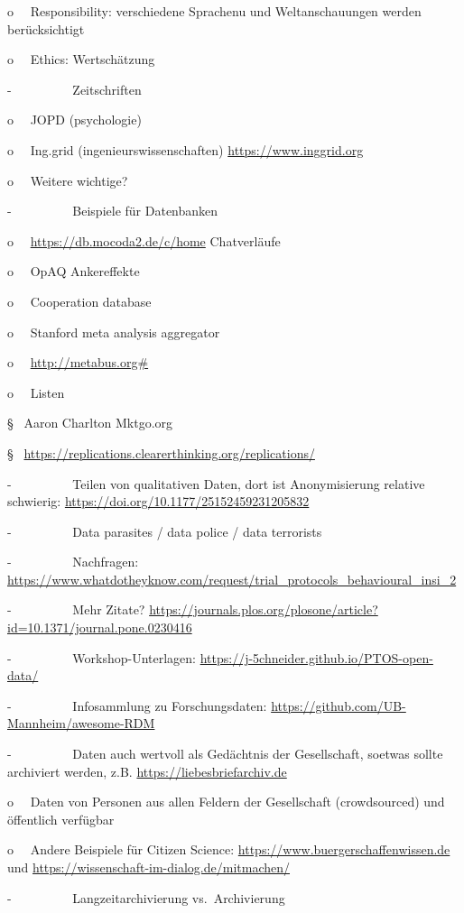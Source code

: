 \documentclass[
  letterpaper,
  DIV=11,
  numbers=noendperiod]{scrreprt}
\begin{document}
o~~ Responsibility: verschiedene Sprachenu und Weltanschauungen werden
berücksichtigt

o~~ Ethics: Wertschätzung

-~~~~~~~~~ Zeitschriften

o~~ JOPD (psychologie)

o~~ Ing.grid (ingenieurswissenschaften) \url{https://www.inggrid.org}

o~~ Weitere wichtige?

-~~~~~~~~~ Beispiele für Datenbanken

o~~ \url{https://db.mocoda2.de/c/home} Chatverläufe

o~~ OpAQ Ankereffekte

o~~ Cooperation database

o~~ Stanford meta analysis aggregator

o~~ \href{http://metabus.org}{http://metabus.org\#}

o~~ Listen

§~ Aaron Charlton Mktgo.org

§~ \url{https://replications.clearerthinking.org/replications/}

-~~~~~~~~~ Teilen von qualitativen Daten, dort ist Anonymisierung
relative schwierig: \url{https://doi.org/10.1177/25152459231205832}

-~~~~~~~~~ Data parasites / data police / data terrorists

-~~~~~~~~~ Nachfragen:
\url{https://www.whatdotheyknow.com/request/trial_protocols_behavioural_insi_2}

-~~~~~~~~~ Mehr Zitate?
\url{https://journals.plos.org/plosone/article?id=10.1371/journal.pone.0230416}

-~~~~~~~~~ Workshop-Unterlagen:
\url{https://j-5chneider.github.io/PTOS-open-data/}

-~~~~~~~~~ Infosammlung zu Forschungsdaten:
\url{https://github.com/UB-Mannheim/awesome-RDM}

-~~~~~~~~~ Daten auch wertvoll als Gedächtnis der Gesellschaft, soetwas
sollte archiviert werden, z.B. \url{https://liebesbriefarchiv.de}

o~~ Daten von Personen aus allen Feldern der Gesellschaft (crowdsourced)
und öffentlich verfügbar

o~~ Andere Beispiele für Citizen Science:
\url{https://www.buergerschaffenwissen.de} und
\url{https://wissenschaft-im-dialog.de/mitmachen/}

-~~~~~~~~~ Langzeitarchivierung vs.~Archivierung
\end{document}
